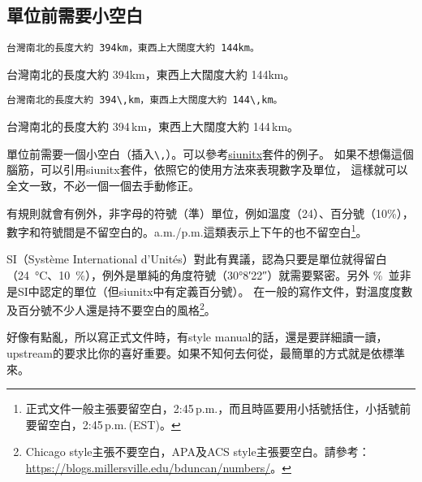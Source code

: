 \subsection{單位前需要小空白}
\label{sub:unit}

\begin{Wrong}
\begin{verbatim}
台灣南北的長度大約 394km，東西上大闊度大約 144km。
\end{verbatim}

台灣南北的長度大約 394km，東西上大闊度大約 144km。
\end{Wrong}

\begin{Right}
\begin{verbatim}
台灣南北的長度大約 394\,km，東西上大闊度大約 144\,km。
\end{verbatim}

台灣南北的長度大約 394\,km，東西上大闊度大約 144\,km。
\end{Right}

單位前需要一個小空白（插入\verb|\,|）。可以參考\href{https://github.com/josephwright/siunitx}{\sf siunitx}套件的例子。
如果不想傷這個腦筋，可以引用{\sf siunitx}套件，依照它的使用方法來表現數字及單位，
這樣就可以全文一致，不必一個一個去手動修正。

有規則就會有例外，非字母的符號（準）單位，例如溫度（24\textcelsius）、百分號（10\%），數字和符號間是不留空白的。a.m./p.m.\/這類表示上下午的也不留空白\footnote{正式文件一般主張要留空白，2:45\,p.m.，而且時區要用小括號括住，小括號前要留空白，2:45\,p.m.\,(EST)。}。

{\sf SI}（Système International d'Unités）對此有異議，認為只要是單位就得留白（\SI{24}{\degreeCelsius}、\SI{10}{\percent}），例外是單純的角度符號（\ang{30;8;22}）就需要緊密。另外 \%\ 並非是{\sf SI}中認定的單位（但{\sf siunitx}中有定義百分號）。
在一般的寫作文件，對溫度度數及百分號不少人還是持不要空白的風格\footnote{Chicago style主張不要空白，APA及ACS style主張要空白。請參考：\url{https://blogs.millersville.edu/bduncan/numbers/}。}。

好像有點亂，所以寫正式文件時，有style manual的話，還是要詳細讀一讀，upstream的要求比你的喜好重要。如果不知何去何從，最簡單的方式就是依標準來。

\marginpar{\back}
